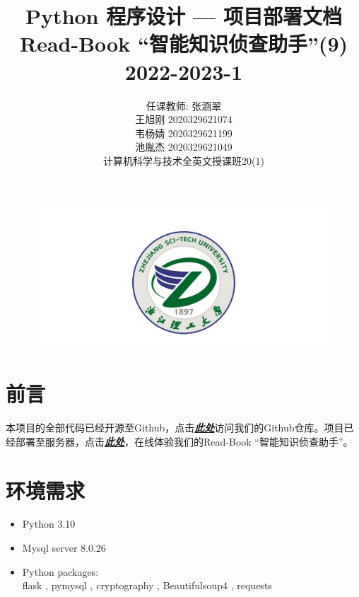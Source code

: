 \documentclass[twoside,11pt]{article}
\newcommand\studentName{\Large \centering 任课教师: 张涵翠\\王旭刚 2020329621074\\韦杨婧 2020329621199\\池胤杰 2020329621049\\计算机科学与技术全英文授课班20(1)\\}
\begin{document}
\begin{figure}[H]
    \centering
    \includegraphics[width=1\columnwidth]{figures/zstu-logo.png}
\end{figure}

\title{\Huge Python 程序设计  --- 项目部署文档\\ \vspace{1.5cm} Read-Book ``智能知识侦查助手''(9) \\ \vspace{1.5cm} \huge 2022-2023-1 \\ \vspace{0.8cm}}

\author{\name \studentName{}
    \addr
}

\maketitle
\thispagestyle{empty}
\newpage

\section{前言}
本项目的全部代码已经开源至Github，点击\href{https://github.com/Casta-mere/Read-Book}{\textbf{\emph{此处}}}访问我们的Github仓库。项目已经部署至服务器，点击\href{http://47.116.46.195/}{\textbf{\emph{此处}}}，在线体验我们的Read-Book ``智能知识侦查助手''。

\section{环境需求}
\begin{itemize}
    \item Python 3.10
    \item Mysql server 8.0.26
    \item Python packages:\\
          flask
          , pymysql
          , cryptography
          , Beautifulsoup4
          , requests
\end{itemize}
\end{document}
